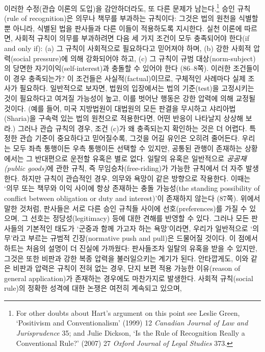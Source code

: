 \documentclass[12pt, oneside]{book}  %
\begin{document}
이러한 수정(관습 이론의 도입)을 감안하더라도, 또 다른 문제가
남는다.\footnote{For other doubts about Hart's argument on this point
  see Leslie Green, `Positivism and Conventionalism' (1999) 12
  \emph{Canadian Journal of Law and Jurisprudence} 35; and Julie
  Dickson, `Is the Rule of Recognition Really a Conventional Rule?'
  (2007) 27 \emph{Oxford Journal of Legal Studies} 373.} 승인 규칙(rule
of recognition)은 의무나 책무를 부과하는 규칙이다: 그것은 법의 원천을
식별할 뿐 아니라, 식별된 법을 판사들과 다른 이들이 적용하도록 지시한다.
실천 이론에 따르면, 사회적 규칙이 의무를 부과하려면 다음 세 가지 조건이
모두 충족되어야 한다(if and only if): (a) 그 규칙이 사회적으로 필요하다고 믿어져야 하며,
(b) 강한 사회적 압력(social pressure)에 의해 강화되어야 하고, (c) 그
규칙이 규범 대상(norm-subject)의 당면한 자기이익(self-interest)과 충돌할
수 있어야 한다 (86--8쪽). 이러한 조건들이 이 경우 충족되는가? 이
조건들은 사실적(factual)이므로, 구체적인 사례마다 실제 조사가 필요하다.
일반적으로 보자면, 법원의 입장에서는 법의 기준(test)을 고정시키는 것이
필요하다고 여겨질 가능성이 높고, 이를 벗어난 행동은 강한 압력에 의해
교정될 것이다. (예를 들어, 미국 지방법원이 대법원의 모든 판결을 무시하고
샤리아법(Sharia)을 구속력 있는 법의 원천으로 적용한다면, 어떤 반응이
나타날지 상상해 보라.) 그러나 관습 규칙의 경우, 조건 (c)가 왜 충족되는지
확인하는 것은 더 어렵다. 특정한 관습 기준이 중요하다고 믿어질수록,
그것을 어길 유인은 오히려 줄어든다. 우리는 모두 좌측 통행이든 우측
통행이든 선택할 수 있지만, 공통된 관행이 존재하는 상황에서는 그
반대편으로 운전할 유혹은 별로 없다. 일탈의 유혹은 일반적으로
\emph{공공재(public goods)}에 관한 규칙, 즉 무임승차(free-riding)가
가능한 규칙에서 더 자주 발생한다. 하지만 규칙이 관습적인 경우, 의무와
욕망이 같은 방향으로 작용한다. 이때는 `의무 또는 책무와 이익 사이에 항상
존재하는 충돌 가능성(the standing possibility of conflict between
obligation or duty and interest)'이 존재하지 않는다 (87쪽). 위에서 말한
것처럼, 판사들은 서로 다른 승인 규칙들 사이에 선호(preferences)를 가질
수 있으며, 그 선호는 정당성(legitimacy) 등에 대한 견해를 반영할 수 있다.
그러나 모든 판사들의 기본적인 태도가 `군중과 함께 가고자 하는
욕망'이라면, 우리가 일반적으로 `의무'라고 부르는 규범적 긴장(normative
push and pull)은 드물어질 것이다. 이 점에서 하트는 처음의 설명이 더
진실에 가까웠다: 판사들조차 일탈의 유혹을 받을 수 있지만, 그것은 또한
비판과 강한 복종 압력을 불러일으키는 계기가 된다. 안타깝게도, 이와 같은
비판과 압력은 규칙이 전혀 없는 경우, 단지 보편 적용 가능한 이유(reason
of general application)가 존재하는 경우에도 마찬가지로 발생한다. 사회적
규칙(social rule)의 정확한 성격에 대한 논쟁은 여전히 계속되고 있으며,
\end{document}
